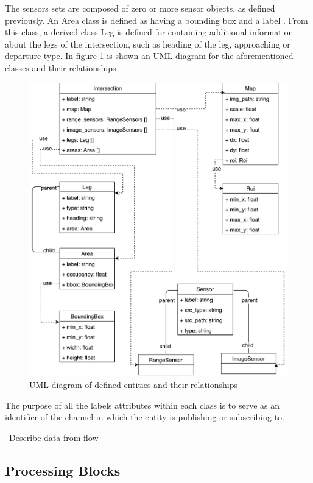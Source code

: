 The sensors sets are composed of zero or more sensor objects, as defined previously. An Area class is defined as having a bounding box and a label	. From this class, a derived class Leg is defined for containing additional information about the legs of the intersection, such as heading of the leg, approaching or departure type. In figure \ref{data_model} is shown an UML diagram for the aforementioned classes and their relationships

\begin{figure}[ht!]
\centering
\includegraphics[scale=0.55]{fig/3/data_model.pdf}
\caption{UML diagram of defined entities and their relationships}
\label{data_model}
\end{figure}

The purpose of all the labels attributes within each class is to serve as an identifier of the channel in which the entity is publishing or subscribing to.

--Describe data from flow



\subsection{Processing Blocks}